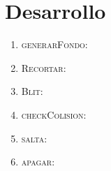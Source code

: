 \section{Desarrollo}

\begin{enumerate}
 \item \textsc{generarFondo}:

\item \textsc{Recortar}:

\item \textsc{Blit}:

\item \textsc{checkColision}:

\item \textsc{salta}:

\item \textsc{apagar}:
\end{enumerate}

